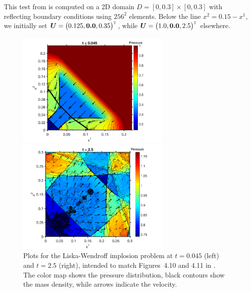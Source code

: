\documentclass[letterpaper]{jpconf}
\newcommand{\vect}[1]{\boldsymbol{#1}}
\newcommand{\trans}{\textnormal{\tiny\textsc{T}}}
\begin{document}
This test from \cite{liskaWendroff_2003} is computed on a 2D domain $D=[0,0.3]\times[0,0.3]$ with reflecting boundary conditions using $256^{2}$ elements.  
Below the line $x^{2}=0.15-x^{1}$, we initially set $\vect{U}=\big(0.125,\vect{0.0},0.35\big)^{\trans}$, while $\vect{U}=\big(1.0,\vect{0.0},2.5\big)^{\trans}$ elsewhere.  

\begin{figure}[b]
  \centering
  \begin{minipage}{18pc}
    \includegraphics[width=18pc]{./Figures/Implosion_01_HighTCI_Astronum_2018}
  \end{minipage}\hspace{0.5pc}%
  \begin{minipage}{18pc}
    \includegraphics[width=18pc]{./Figures/Implosion_02_HighTCI_Astronum_2018}
  \end{minipage}
  \caption{\label{fig:Implosion}Plots for the Liska-Wendroff implosion problem at $t=0.045$ (left) and $t=2.5$ (right), intended to match Figures~4.10 and 4.11 in \cite{liskaWendroff_2003}.  The color map shows the pressure distribution, black contours show the mass density, while arrows indicate the velocity.}
\end{figure}
\end{document}
